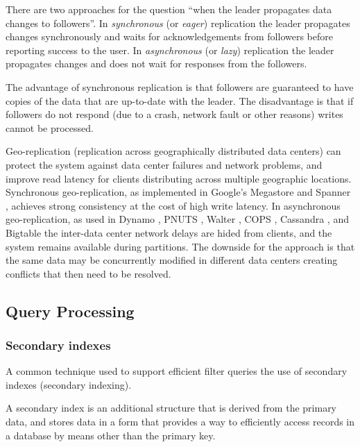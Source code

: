 \bigskip
\noindent
There are two approaches for the question ``when the leader propagates data changes to followers''.
In \textit{synchronous} (or \textit{eager}) replication the leader propagates changes synchronously and waits for acknowledgements from followers before reporting
success to the user.
In \textit{asynchronous} (or \textit{lazy}) replication the leader propagates changes and does not wait for responses from the followers.

The advantage of synchronous replication is that followers are guaranteed to have copies of the data that are up-to-date with the leader.
The disadvantage is that if followers do not respond (due to a crash, network fault or other reasons) writes cannot be processed.

\bigskip
\noindent
Geo-replication (replication across geographically distributed data centers) can protect the system against data center failures and network problems,
and improve read latency for clients distributing across multiple geographic locations.
Synchronous geo-replication, as implemented in Google's Megastore \cite{baker:megastore} and Spanner \cite{corbett:spanner, bacon:spanner},
achieves strong consistency at the cost of high write latency.
In asynchronous geo-replication, as used in Dynamo \cite{deCandia:dynamo}, PNUTS \cite{cooper:pnuts08, cooper:pnuts19},
Walter \cite{sovran:walter}, COPS \cite{lloyd:cops}, Cassandra \cite{lakshman:cassandra}, and Bigtable \cite{chang:bigtable}
the inter-data center network delays are hided from clients, and the system remains available during partitions.
The downside for the approach is that the same data may be concurrently modified in different data centers creating
conflicts that then need to be resolved.


\subsection{Query Processing}
\subsubsection{Secondary indexes}

A common technique used to support efficient filter queries the use of secondary indexes (secondary indexing).

A secondary index is an additional structure that is derived from the primary data, and stores data in a form that
provides a way to efficiently access records in a database by means other than the primary key.

